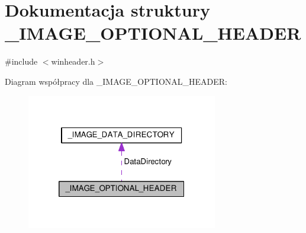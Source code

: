 \hypertarget{struct___i_m_a_g_e___o_p_t_i_o_n_a_l___h_e_a_d_e_r}{\section{Dokumentacja struktury \-\_\-\-I\-M\-A\-G\-E\-\_\-\-O\-P\-T\-I\-O\-N\-A\-L\-\_\-\-H\-E\-A\-D\-E\-R}
\label{struct___i_m_a_g_e___o_p_t_i_o_n_a_l___h_e_a_d_e_r}
}


{\ttfamily \#include $<$winheader.\-h$>$}



Diagram współpracy dla \-\_\-\-I\-M\-A\-G\-E\-\_\-\-O\-P\-T\-I\-O\-N\-A\-L\-\_\-\-H\-E\-A\-D\-E\-R\-:
\nopagebreak
\begin{figure}[H]
\begin{center}
\leavevmode
\includegraphics[width=236pt]{struct___i_m_a_g_e___o_p_t_i_o_n_a_l___h_e_a_d_e_r__coll__graph}
\end{center}
\end{figure}
